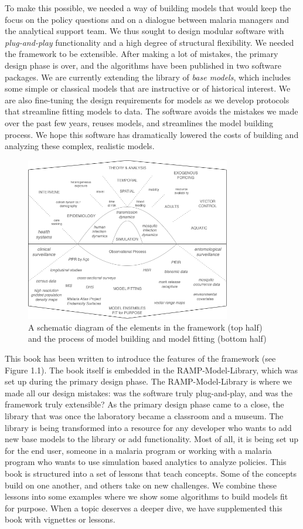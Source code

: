 \documentclass[
]{book}
\begin{document}
To make this possible, we needed a way of building models that would keep the focus on the policy questions and on a dialogue between malaria managers and the analytical support team. We thus sought to design modular software with \emph{plug-and-play} functionality and a high degree of structural flexibility. We needed the framework to be extensible. After making a lot of mistakes, the primary design phase is over, and the algorithms have been published in two software packages. We are currently extending the library of \emph{base models}, which includes some simple or classical models that are instructive or of historical interest. We are also fine-tuning the design requirements for models as we develop protocols that streamline fitting models to data. The software avoids the mistakes we made over the past few years, reuses models, and streamlines the model building process. We hope this software has dramatically lowered the costs of building and analyzing these complex, realistic models.

\begin{figure}
\centering
\includegraphics[width=0.8\textwidth,height=\textheight]{Figures/ScalableComplexity.png}
\caption{A schematic diagram of the elements in the framework (top half) and the process of model building and model fitting (bottom half)}
\end{figure}

This book has been written to introduce the features of the framework (see Figure 1.1). The book itself is embedded in the RAMP-Model-Library, which was set up during the primary design phase. The RAMP-Model-Library is where we made all our design mistakes: was the software truly plug-and-play, and was the framework truly extensible? As the primary design phase came to a close, the library that was once the laboratory became a classroom and a museum. The library is being transformed into a resource for any developer who wants to add new base models to the library or add functionality. Most of all, it is being set up for the end user, someone in a malaria program or working with a malaria program who wants to use simulation based analytics to analyze policies. This book is structured into a set of lessons that teach concepts. Some of the concepts build on one another, and others take on new challenges. We combine these lessons into some examples where we show some algorithms to build models fit for purpose. When a topic deserves a deeper dive, we have supplemented this book with vignettes or lessons.
\end{document}
